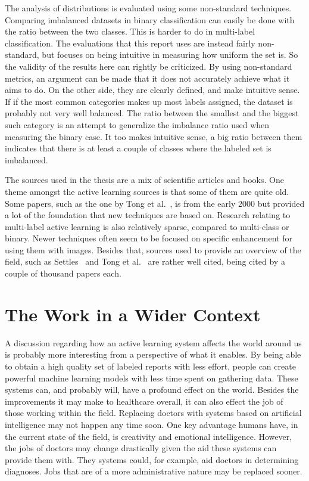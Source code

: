 The analysis of distributions is evaluated using some non-standard techniques.
Comparing imbalanced datasets in binary classification can easily be done with the ratio between the two classes.
This is harder to do in multi-label classification. 
The evaluations that this report uses are instead fairly non-standard, but focuses on being intuitive in measuring how uniform the set is.
So the validity of the results here can rightly be criticized.
By using non-standard metrics, an argument can be made that it does not accurately achieve what it aims to do.
On the other side, they are clearly defined, and make intuitive sense.
If if the most common categories makes up most labels assigned, the dataset is probably not very well balanced.
The ratio between the smallest and the biggest such category is an attempt to generalize the imbalance ratio used when measuring the binary case.
It too makes intuitive sense, a big ratio between them indicates that there is at least a couple of classes where the labeled set is imbalanced.

The sources used in the thesis are a mix of scientific articles and books.
One theme amongst the active learning sources is that some of them are quite old.
Some papers, such as the one by Tong et al.~\cite{tong2001support}, is from the early 2000 but provided a lot of the foundation that new techniques are based on.
Research relating to multi-label active learning is also relatively sparse, compared to multi-class or binary.
Newer techniques often seem to be focused on specific enhancement for using them with images.
Besides that, sources used to provide an overview of the field, such as Settles~\cite{settles2012active} and Tong et al\@.~\cite{tong2001active} are rather well cited, being cited by a couple of thousand papers each.

\section{The Work in a Wider Context}

A discussion regarding how an active learning system affects the world around us is probably more interesting from a perspective of what it enables.
By being able to obtain a high quality set of labeled reports with less effort, people can create powerful machine learning models with less time spent on gathering data.
These systems can, and probably will, have a profound effect on the world.
Besides the improvements it may make to healthcare overall, it can also effect the job of those working within the field.
Replacing doctors with systems based on artificial intelligence may not happen any time soon.
One key advantage humans have, in the current state of the field, is creativity and emotional intelligence.
However, the jobs of doctors may change drastically given the aid these systems can provide them with.
They systems could, for example, aid doctors in determining diagnoses.
Jobs that are of a more administrative nature may be replaced sooner.

